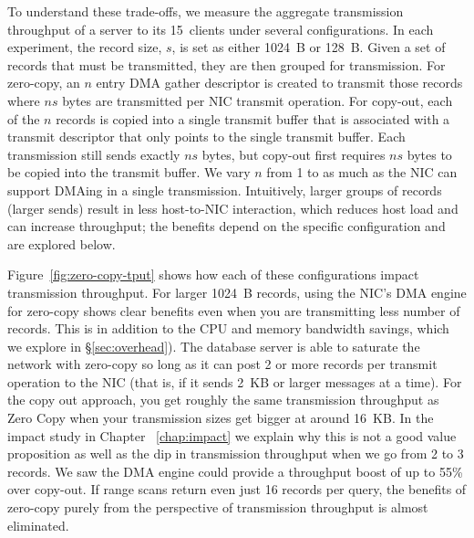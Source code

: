 To understand these trade-offs, we measure the aggregate transmission
throughput of a server to its 15~clients under several
configurations.  In each experiment, the record size, $s$, is set as either 1024~B or
128~B. Given a set of records that must be transmitted, they are then grouped
for transmission. For zero-copy, an $n$ entry DMA gather descriptor is created
to transmit those records where $ns$ bytes are transmitted per NIC transmit
operation. For copy-out, each of the $n$ records is copied into a single
transmit buffer that is associated with a transmit descriptor that only points
to the single transmit buffer. Each transmission still sends exactly $ns$
bytes, but copy-out first requires $ns$ bytes to be copied into the transmit buffer.
We vary $n$ from 1 to as much as the NIC can support DMAing in a single transmission.
Intuitively, larger groups of records (larger sends) result in less host-to-NIC
interaction, which reduces host load and can increase throughput; the benefits
depend on the specific configuration and are explored below.


Figure~\ref{fig:zero-copy-tput} shows how each of these configurations impact
transmission throughput. For larger 1024~B records, using the NIC's DMA engine
for zero-copy shows clear benefits even when you are transmitting less number of 
records. This is in addition to the CPU and memory bandwidth savings, which 
we explore in \S\ref{sec:overhead}). The database server is able
to saturate the network with zero-copy so long as it can post 2 or more
records per transmit operation to the NIC (that is, if it sends 2~KB or larger
messages at a time). For the copy out approach, you get roughly the same transmission 
throughput as Zero Copy when your transmission sizes get bigger at around 16~KB. In 
the impact study in Chapter ~\ref{chap:impact} we explain why this is not a good value 
proposition as well as the dip in transmission throughput when we go from 2 to 3 records.
We saw the DMA engine could provide a throughput boost
of up to 55\% over copy-out. If range scans return even just 16 records per query, the
benefits of zero-copy purely from the perspective of transmission throughput is almost eliminated.

